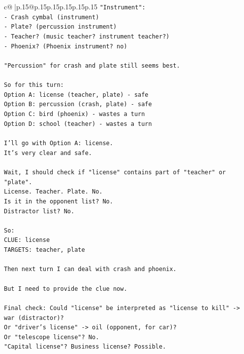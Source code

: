 \documentclass{article}
\begin{document}
{\begin{supertabular}{c@{$\;$}|p{.15\linewidth}@{}p{.15\linewidth}p{.15\linewidth}p{.15\linewidth}p{.15\linewidth}p{.15\linewidth}}
{{{\texttt{"Instrument":} \\
\texttt{{-} Crash cymbal (instrument)} \\
\texttt{{-} Plate? (percussion instrument)} \\
\texttt{{-} Teacher? (music teacher? instrument teacher?)} \\
\texttt{{-} Phoenix? (Phoenix instrument? no)} \\
\\ 
\texttt{"Percussion" for crash and plate still seems best.} \\
\\ 
\texttt{So for this turn:} \\
\texttt{Option A: license (teacher, plate) {-} safe} \\
\texttt{Option B: percussion (crash, plate) {-} safe} \\
\texttt{Option C: bird (phoenix) {-} wastes a turn} \\
\texttt{Option D: school (teacher) {-} wastes a turn} \\
\\ 
\texttt{I'll go with Option A: license.} \\
\texttt{It's very clear and safe.} \\
\\ 
\texttt{Wait, I should check if "license" contains part of "teacher" or "plate".} \\
\texttt{License. Teacher. Plate. No.} \\
\texttt{Is it in the opponent list? No.} \\
\texttt{Distractor list? No.} \\
\\ 
\texttt{So:} \\
\texttt{CLUE: license} \\
\texttt{TARGETS: teacher, plate} \\
\\ 
\texttt{Then next turn I can deal with crash and phoenix.} \\
\\ 
\texttt{But I need to provide the clue now.} \\
\\ 
\texttt{Final check: Could "license" be interpreted as "license to kill" {-}> war (distractor)?} \\
\texttt{Or "driver's license" {-}> oil (opponent, for car)?} \\
\texttt{Or "telescope license"? No.} \\
\texttt{"Capital license"? Business license? Possible.} \\
}}}
\end{supertabular}}
\end{document}
